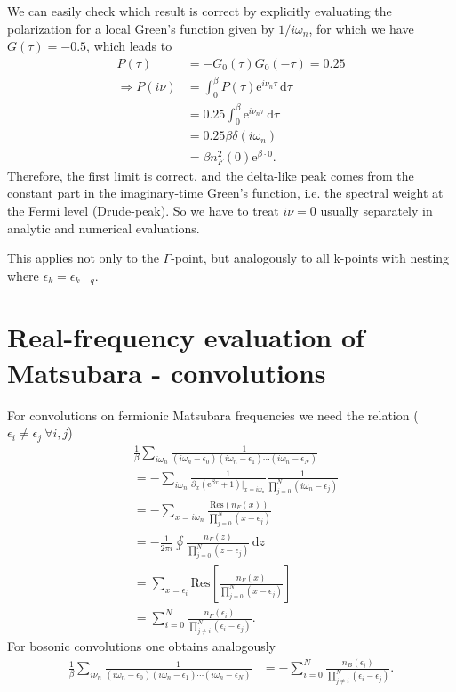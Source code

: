 \documentclass[12pt,a4paper]{scrartcl}
\numberwithin{equation}{section}
\begin{document}
We can easily check which result is correct by explicitly evaluating the polarization
for a local Green's function given by $1/i\omega_n$, for which we have $G(\tau) = -0.5$, 
which leads to
\begin{align}
 P(\tau) &= -G_0(\tau) G_0(-\tau) = 0.25  \\
 \Rightarrow P(i\nu) &= \int_0^{\beta}P(\tau) \mathrm{e}^{i\nu_n \tau} \, \mathrm{d}\tau \\
 &= 0.25 \int_0^{\beta} \mathrm{e}^{i\nu_n \tau} \, \mathrm{d}\tau \\
 &= 0.25 \beta \delta(i\omega_n)\\
 &= \beta  n^2_F(0) \mathrm{e}^{\beta \cdot 0}.
\end{align}
Therefore, the first limit is correct, and the delta-like peak comes from
the constant part in the imaginary-time Green's function, i.e. the spectral
weight at the Fermi level (Drude-peak). So we have to treat $i\nu=0$ usually separately
in analytic and numerical evaluations.

This applies not only to the $\Gamma$-point, but analogously to all k-points with nesting 
where $\epsilon_k=\epsilon_{k-q}$.


\section{Real-frequency evaluation of Matsubara - convolutions}
For convolutions on fermionic Matsubara frequencies we need the relation ($\epsilon_i\neq \epsilon_j \ \forall i,j$)
\begin{align}
 &\frac{1}{\beta}\sum_{i\omega_n} \frac{1}{(i\omega_n-\epsilon_0)(i\omega_n-\epsilon_1)\cdots (i\omega_n-\epsilon_N)} \\
 &= -\sum_{i\omega_n} \frac{1}{\partial_x\left(\mathrm{e}^{\beta x}+1\right)|_{x=i\omega_n}} \frac{1}{\prod_{j=0}^{N}(i\omega_n-\epsilon_j)} \\
 &= -\sum_{x=i\omega_n}  \frac{\mathrm{Res}(n_F(x))}{\prod_{j=0}^{N}(x-\epsilon_j)} \\
 &= -\frac{1}{2\pi i} \oint \frac{n_F(z)}{\prod_{j=0}^{N}(z-\epsilon_j)} \, \mathrm{d}z \\
 &= \sum_{x=\epsilon_i} \mathrm{Res}\left[ \frac{n_F(x)}{\prod_{j=0}^{N}(x-\epsilon_j)} \right] \\
 &= \sum_{i=0}^{N} \frac{n_F(\epsilon_i)}{ \prod_{j\neq i}^{N}(\epsilon_i-\epsilon_j) } .
 \end{align}
For bosonic convolutions one obtains analogously
\begin{align}
 \frac{1}{\beta}\sum_{i\nu_n} \frac{1}{(i\omega_n-\epsilon_0)(i\omega_n-\epsilon_1)\cdots (i\omega_n-\epsilon_N)} 
 &= -\sum_{i=0}^{N} \frac{n_B(\epsilon_i)}{ \prod_{j\neq i}^{N}(\epsilon_i-\epsilon_j) } .
\end{align}
\end{document}
